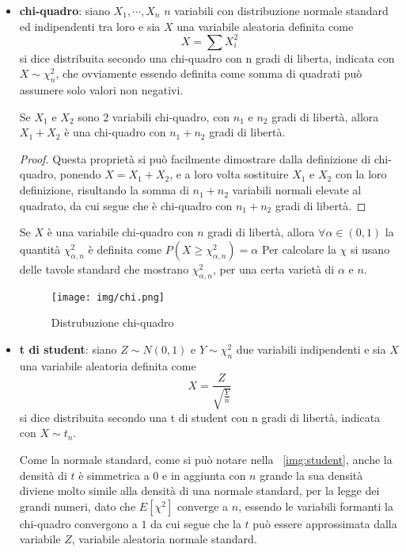 \documentclass[a4paper,12pt, oneside]{book}
\begin{document}
\begin{itemize}
    \item \textbf{chi-quadro}: siano $X_1, \cdots, X_n$ $n$ variabili con distribuzione normale standard ed
        indipendenti tra loro e sia $X$ una variabile aleatoria definita come 
        \[ X = \sum X_i ^ 2 \]
        si dice distribuita secondo una chi-quadro con n gradi di liberta, indicata con $X \sim \chi_n^2$,
        che ovviamente essendo definita come somma di quadrati può assumere solo valori non negativi.
        
\begin{teo}
        Se $X_1$ e $X_2$ sono 2 variabili chi-quadro, con $n_1$ e $n_2$ gradi di libertà, allora 
        $X_1 + X_2$ è una chi-quadro con $n_1 + n_2$ gradi di libertà.\newline
\end{teo}
\begin{proof}
        Questa proprietà si può facilmente dimostrare dalla definizione di chi-quadro, ponendo $X = X_1 + X_2$,
        e a loro volta sostituire $X_1$ e $X_2$ con la loro definizione, risultando la somma di $n_1 + n_2$ variabili
        normali elevate al quadrato, da cui segue che è chi-quadro con $n_1 + n_2$ gradi di libertà.
\end{proof}
        Se $X$ è una variabile chi-quadro con $n$ gradi di libertà, allora $\forall \alpha \in (0, 1)$ la quantità
        $\chi_{\alpha, n}^2$ è definita come $P(X \geq \chi_{\alpha, n}^2) = \alpha$
        Per calcolare la $\chi$ si usano delle tavole standard che mostrano $\chi^2_{\alpha, n}$, per una certa
        varietà di $\alpha$ e $n$.
    \begin{figure}
            \caption{Distrubuzione chi-quadro}
	        \texttt{[image: img/chi.png]}
        \end{figure}
    \item \textbf{t di student}: siano $Z \sim N(0, 1)$ e $Y \sim \chi_n^2$ due variabili indipendenti e
        sia $X$ una variabile aleatoria definita come 
        \[X = \frac{Z}{\sqrt{\frac{Y}{n}}}\]
        si dice distribuita secondo una t di student con n gradi di libertà, indicata con $X \sim t_n$.

        Come la normale standard, come si può notare nella \figurename~\ref{img:student}, anche la densità di $t$
        è simmetrica a $0$ e in aggiunta con $n$ grande la sua densità diviene molto simile alla densità di una 
        normale standard, per la legge dei grandi numeri, dato che $E[\chi^2]$ converge a $n$, essendo le variabili
        formanti la chi-quadro convergono a $1$ da cui segue che la $t$ può essere approssimata dalla variabile $Z$,
        variabile aleatoria normale standard.
        

\end{itemize}
\end{document}
